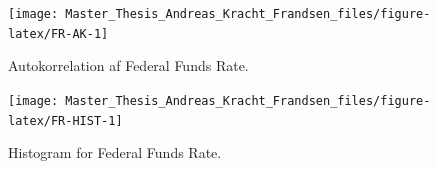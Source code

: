 \documentclass[
  a4paper,
  oneside]{memoir}
\begin{document}
\begin{figure}[H]

{\centering \texttt{[image: Master\_Thesis\_Andreas\_Kracht\_Frandsen\_files/figure-latex/FR-AK-1]} 

}

\caption{Autokorrelation af Federal Funds Rate.}\label{fig:FR-AK}
\end{figure}

\begin{figure}[H]

{\centering \texttt{[image: Master\_Thesis\_Andreas\_Kracht\_Frandsen\_files/figure-latex/FR-HIST-1]} 

}

\caption{Histogram for Federal Funds Rate.}\label{fig:FR-HIST}
\end{figure}
\end{document}
